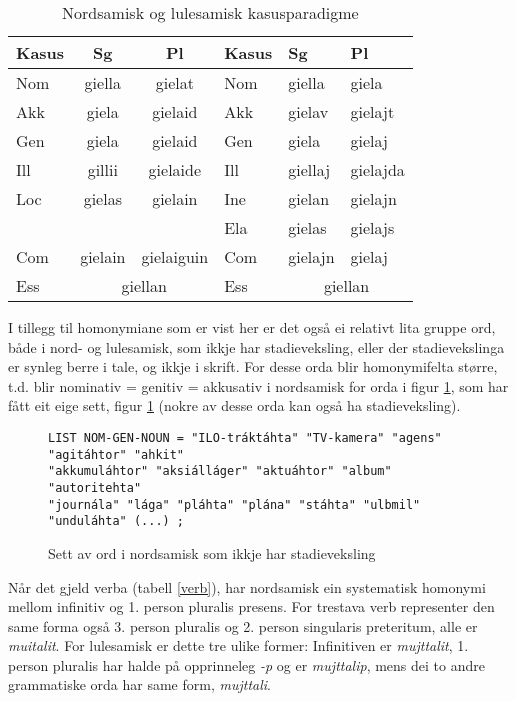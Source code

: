 \documentclass[a4paper,norsk]{article}
\begin{document}
\begin{table}[htdp]
\caption{Nordsamisk  og lulesamisk kasusparadigme}
\begin{center}
\begin{tabular}{|l|c|c||l|l|l|}
\hline
Kasus  & Sg & Pl & Kasus & Sg & Pl \\
\hline
Nom & giella & gielat & Nom & giella & giela \\
\hline
Akk & giela & gielaid & Akk & gielav & gielajt \\
\hline
Gen & giela & gielaid & Gen & giela & gielaj \\
\hline
Ill & gillii & gielaide & Ill & giellaj & gielajda \\
\hline
Loc & gielas & gielain & Ine & gielan & gielajn \\
\hline
    &        &         & Ela & gielas & gielajs \\
\hline
Com & gielain & gielaiguin & Com & gielajn & gielaj \\
\hline
Ess & \multicolumn{2}{c||}{giellan}  & Ess & \multicolumn{2}{c|}{giellan}  \\
\hline
\end{tabular}
\end{center}
\label{smecas}
\end{table}%

I tillegg til homonymiane som er vist her er det også ei relativt lita gruppe ord, både i nord- og lulesamisk, som ikkje har stadieveksling, eller der stadievekslinga er synleg berre i tale, og ikkje i skrift. For desse orda blir homonymifelta større, t.d. blir nominativ = genitiv = akkusativ i nordsamisk for  orda i figur \ref{nomgenlist}, som har fått eit eige sett, figur \ref{nomgenlist} (nokre av desse orda kan også ha stadieveksling).%

\begin{figure}[htbp]
\begin{center}
\begin{verbatim}
LIST NOM-GEN-NOUN = "ILO-tráktáhta" "TV-kamera" "agens" "agitáhtor" "ahkit" 
"akkumuláhtor" "aksiálláger" "aktuáhtor" "album" "autoritehta"
"journála" "lága" "pláhta" "plána" "stáhta" "ulbmil" "unduláhta" (...) ;
\end{verbatim}
\caption{Sett av ord i nordsamisk som ikkje har stadieveksling}
\label{nomgenlist}
\end{center}
\end{figure}

Når det gjeld verba (tabell \ref{verb}), har nordsamisk ein systematisk homonymi mellom infinitiv og 1. person pluralis presens. For trestava verb representer den same forma også 3. person pluralis og 2. person singularis preteritum, alle er \textit{muitalit}. For lulesamisk er dette tre ulike former: Infinitiven er \textit{mujttalit}, 1. person pluralis har halde på opprinneleg \textit{-p} og er \textit{mujttalip}, mens dei to andre grammatiske orda har same form, \textit{mujttali}.%
\end{document}

